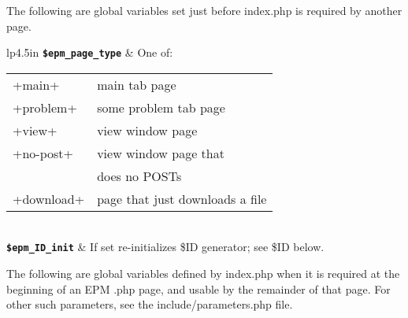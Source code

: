 \documentclass[12pt]{article}
\newcommand{\TT}[1]{{\tt \bfseries #1}}
\begin{document}
The following are global variables set just before index.php
is required by another page.

\begin{center}
\begin{tabular}{lp{4.5in}}
\TT{\$epm\_page\_type}	& One of: \begin{tabular}[t]{ll}
                          +main+ & main tab page \\
			  +problem+ & some problem tab page \\
			  +view+ & view window page \\
			  +no-post+ & view window page that \\
			            & does no POSTs \\
			  +download+ & page that just downloads a file \\
			  \end{tabular}
\\[0.5ex]
\TT{\$epm\_ID\_init}	& If set re-initializes \$ID generator;
                          see \$ID below. \\
\end{tabular}
\end{center}

The following are global variables defined by index.php when it is
required at the beginning of an EPM .php page, and usable
by the remainder of that page.  For other such parameters,
see the include/parameters.php file.
\end{document}
